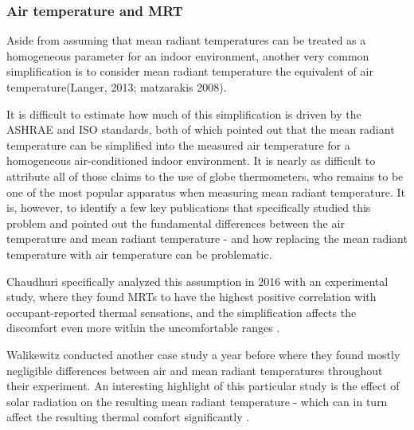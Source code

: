 \subsubsection{Air temperature and MRT}
        Aside from assuming that mean radiant temperatures can be treated as a homogeneous parameter for an indoor environment, another very common simplification is to consider mean radiant temperature the equivalent of air temperature\cite{kantor_most_2011}(Langer, 2013; matzarakis 2008). 
        
        It is difficult to estimate how much of this simplification is driven by the ASHRAE and ISO standards, both of which pointed out that the mean radiant temperature can be simplified into the measured air temperature for a homogeneous air-conditioned indoor environment. It is nearly as difficult to attribute all of those claims to the use of globe thermometers, who remains to be one of the most popular apparatus when measuring mean radiant temperature\cite{kantor_most_2011}. It is, however, to identify a few key publications that specifically studied this problem and pointed out the fundamental differences between the air temperature and mean radiant temperature - and how replacing the mean radiant temperature with air temperature can be problematic. 

        Chaudhuri specifically analyzed this assumption in 2016 with an experimental study, where they found MRTs to have the highest positive correlation with occupant-reported thermal sensations, and the simplification affects the discomfort even more within the uncomfortable ranges \cite{chaudhuri_assuming_2016}.

        Walikewitz conducted another case study a year before where they found mostly negligible differences between air and mean radiant temperatures throughout their experiment. An interesting highlight of this particular study is the effect of solar radiation on the resulting mean radiant temperature - which can in turn affect the resulting thermal comfort significantly \cite{walikewitz_difference_2015}. 

